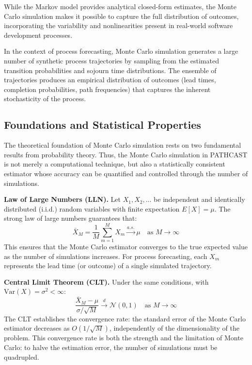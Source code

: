 While the Markov model provides analytical closed-form estimates, the Monte Carlo simulation makes it possible to capture the full distribution of outcomes, incorporating the variability and nonlinearities present in real-world software development processes.

In the context of process forecasting, Monte Carlo simulation generates a
large number of synthetic process trajectories by sampling from the
estimated transition probabilities and sojourn time distributions.
The ensemble of trajectories produces an empirical distribution of
outcomes (lead times, completion probabilities, path frequencies) that
captures the inherent stochasticity of the process.


\subsection{Foundations and Statistical Properties}
\label{sec:mc-foundations}

The theoretical foundation of Monte Carlo simulation rests on two
fundamental results from probability theory. Thus, the Monte Carlo simulation in PATHCAST is not merely a computational technique, but also a statistically consistent estimator whose accuracy can be quantified and controlled through the number of simulations.

\textbf{Law of Large Numbers (LLN).} Let $X_1, X_2, \ldots$ be
independent and identically distributed (i.i.d.) random variables with
finite expectation $E[X] = \mu$. The strong law of large numbers
guarantees that:
\begin{equation}
\label{eq:lln}
\bar{X}_M = \frac{1}{M} \sum_{m=1}^{M} X_m \xrightarrow{a.s.} \mu
\quad \text{as } M \to \infty
\end{equation}
This ensures that the Monte Carlo estimator converges to the true
expected value as the number of simulations increases. For process
forecasting, each $X_m$ represents the lead time (or outcome) of a
single simulated trajectory.

\textbf{Central Limit Theorem (CLT).} Under the same conditions, with
$\text{Var}(X) = \sigma^2 < \infty$:
\begin{equation}
\label{eq:clt}
\frac{\bar{X}_M - \mu}{\sigma / \sqrt{M}}
\xrightarrow{d} \mathcal{N}(0, 1)
\quad \text{as } M \to \infty
\end{equation}
The CLT establishes the convergence rate: the standard error of the
Monte Carlo estimator decreases as $O(1/\sqrt{M})$, independently of
the dimensionality of the problem. This convergence rate is both the
strength and the limitation of Monte Carlo: to halve the estimation
error, the number of simulations must be quadrupled.

